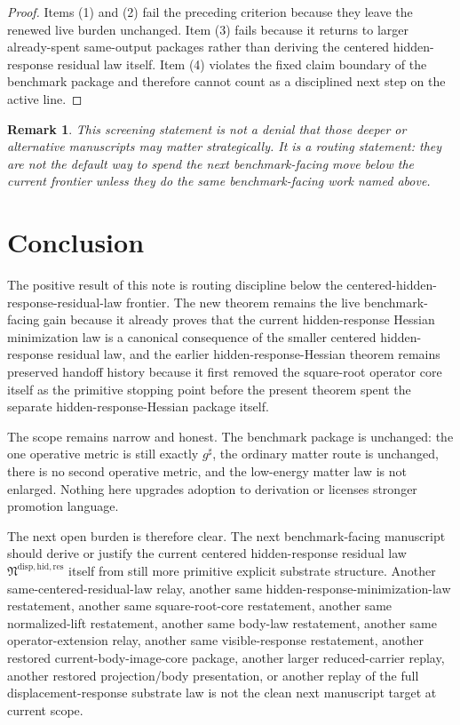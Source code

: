 \documentclass[11pt]{article}
\newcommand{\CompletedMetric}{g^{\sharp}}
\newcommand{\ResidualLawPackage}{\mathfrak N^{\mathrm{disp,hid,res}}}
\newtheorem{remark}{Remark}
\begin{document}
\begin{proof}
Items (1) and (2) fail the preceding criterion because they leave the renewed live burden unchanged. Item (3) fails because it returns to larger already-spent same-output packages rather than deriving the centered hidden-response residual law itself. Item (4) violates the fixed claim boundary of the benchmark package and therefore cannot count as a disciplined next step on the active line.
\end{proof}

\begin{remark}
This screening statement is not a denial that those deeper or alternative manuscripts may matter strategically. It is a routing statement: they are not the default way to spend the next benchmark-facing move below the current frontier unless they do the same benchmark-facing work named above.
\end{remark}

\section{Conclusion}

The positive result of this note is routing discipline below the centered-hidden-response-residual-law frontier. The new theorem remains the live benchmark-facing gain because it already proves that the current hidden-response Hessian minimization law is a canonical consequence of the smaller centered hidden-response residual law, and the earlier hidden-response-Hessian theorem remains preserved handoff history because it first removed the square-root operator core itself as the primitive stopping point before the present theorem spent the separate hidden-response-Hessian package itself.

The scope remains narrow and honest. The benchmark package is unchanged: the one operative metric is still exactly \(\CompletedMetric\), the ordinary matter route is unchanged, there is no second operative metric, and the low-energy matter law is not enlarged. Nothing here upgrades adoption to derivation or licenses stronger promotion language.

The next open burden is therefore clear. The next benchmark-facing manuscript should derive or justify the current centered hidden-response residual law \(\ResidualLawPackage\) itself from still more primitive explicit substrate structure. Another same-centered-residual-law relay, another same hidden-response-minimization-law restatement, another same square-root-core restatement, another same normalized-lift restatement, another same body-law restatement, another same operator-extension relay, another same visible-response restatement, another restored current-body-image-core package, another larger reduced-carrier replay, another restored projection/body presentation, or another replay of the full displacement-response substrate law is not the clean next manuscript target at current scope.
\end{document}
